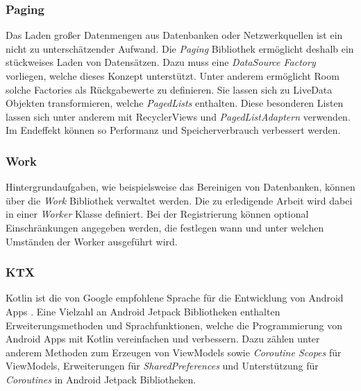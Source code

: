 \documentclass[a4paper, 11pt]{article}
\begin{document}
\subsubsection{Paging}
\label{subsubsec:app:jetpack:paging}
Das Laden großer Datenmengen aus Datenbanken oder Netzwerkquellen ist ein nicht zu unterschätzender Aufwand.
Die \textit{Paging} Bibliothek ermöglicht deshalb ein stückweises Laden von Datensätzen.
Dazu muss eine \textit{DataSource Factory} vorliegen, welche dieses Konzept unterstützt.
Unter anderem ermöglicht Room solche Factories als Rückgabewerte zu definieren.
Sie lassen sich zu LiveData Objekten transformieren, welche \textit{PagedLists} enthalten.
Diese besonderen Listen lassen sich unter anderem mit RecyclerViews und \textit{PagedListAdaptern} verwenden.
Im Endeffekt können so Performanz und Speicherverbrauch verbessert werden.

\subsubsection{Work}
\label{subsubsec:app:jetpack:work}
Hintergrundaufgaben, wie beispielsweise das Bereinigen von Datenbanken, können über die \textit{Work} Bibliothek verwaltet werden.
Die zu erledigende Arbeit wird dabei in einer \textit{Worker} Klasse definiert.
Bei der Registrierung können optional Einschränkungen angegeben werden, die festlegen wann und unter welchen Umständen der Worker ausgeführt wird.

\subsubsection{KTX}
\label{subsubsec:app:jetpack:extensions}
Kotlin ist die von Google empfohlene Sprache für die Entwicklung von Android Apps \autocite{androidkotlin}.
Eine Vielzahl an Android Jetpack Bibliotheken enthalten Erweiterungsmethoden und Sprachfunktionen, welche die Programmierung von Android Apps mit Kotlin vereinfachen und verbessern.
Dazu zählen unter anderem Methoden zum Erzeugen von ViewModels sowie \textit{Coroutine Scopes} für ViewModels, Erweiterungen für \textit{SharedPreferences} und Unterstützung für \textit{Coroutines} in Android Jetpack Bibliotheken.
\end{document}
